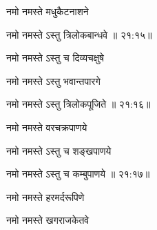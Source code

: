 \nemslokac

{\devanagarifont नमो नमस्ते मधुकैटनाशने }%
  \dontdisplaylinenum    {}%



\nemslokad

{\devanagarifont नमो नमस्ते ऽस्तु त्रिलोकबान्धवे {॥ २१:१५॥} \veg\dontdisplaylinenum }%
 
\ujvers{}

\nemslokab

{\devanagarifont नमो नमस्ते ऽस्तु च दिव्यचक्षुषे  \danda\dontdisplaylinenum }%
 
\nemslokac

{\devanagarifont नमो नमस्ते ऽस्तु भवान्तपारगे }%
  \dontdisplaylinenum


\nemslokad

{\devanagarifont नमो नमस्ते ऽस्तु त्रिलोकपूजिते {॥ २१:१६॥} \veg\dontdisplaylinenum }%
 
\ujvers{}

\nemslokab

{\devanagarifont नमो नमस्ते वरचक्रपाणये  \danda\dontdisplaylinenum }%

\nemslokac

{\devanagarifont नमो नमस्ते ऽस्तु च शङ्खपाणये }%
  \dontdisplaylinenum


\nemslokad

{\devanagarifont नमो नमस्ते ऽस्तु च कम्बुपाणये {॥ २१:१७॥} \veg\dontdisplaylinenum }%
 
\ujvers{}    %


\nemslokab

{\devanagarifont नमो नमस्ते हरमर्दरूपिणे  \danda\dontdisplaylinenum }%

\nemslokac

{\devanagarifont नमो नमस्ते खगराजकेतवे }%
  \dontdisplaylinenum    {}%

